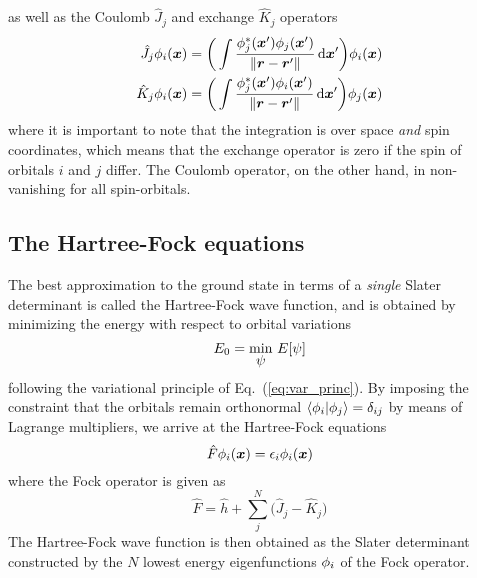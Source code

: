 as well as the Coulomb $\hat{J}_j$ and exchange $\hat{K}_j$ operators
\begin{align}
    \hat{J}_j \phi_i(\boldsymbol x) &= \bigg(\int \frac{\phi_j^{\ast}(\boldsymbol x')\phi_j(\boldsymbol x')}
	{\|\boldsymbol r-\boldsymbol r'\|}\,\mathrm{d}\boldsymbol x'\bigg) \phi_i(\boldsymbol x)\\
    \hat{K}_j \phi_i(\boldsymbol x) &= \bigg(\int \frac{\phi_j^{\ast}(\boldsymbol x')\phi_i(\boldsymbol x')}
	{\|\boldsymbol r-\boldsymbol r'\|}\,\mathrm{d}\boldsymbol x'\bigg) \phi_j(\boldsymbol x)
\end{align}
where it is important to note that the integration is over space \emph{and} spin coordinates,
which means that the exchange operator is zero if the spin of orbitals $i$ and $j$ differ. 
The Coulomb operator, on the other hand, in non-vanishing for all spin-orbitals.

\subsection{The Hartree-Fock equations}
The best approximation to the ground state in terms of a \emph{single} Slater determinant is 
called the Hartree-Fock wave function, and is obtained by minimizing the energy with respect 
to orbital variations
\begin{equation}
    E_0 = \underset{\hbox{\ensuremath{\psi}}}{\text{min}}\ E[\psi]
\end{equation}
following the variational principle of Eq.~(\ref{eq:var_princ}). By imposing the constraint 
that the orbitals remain orthonormal $\langle\phi_i|\phi_j\rangle = \delta_{ij}$
by means of Lagrange multipliers, we arrive at the Hartree-Fock equations
\begin{equation}
    \hat{F}\phi_i(\boldsymbol x) = \epsilon_i \phi_i(\boldsymbol x)
\end{equation}
where the Fock operator is given as
\begin{equation}
    \hat{F} = \hat{h} + \sum_j^N \Big(\hat{J}_j - \hat{K}_j\Big)
\end{equation}
The Hartree-Fock wave function is then obtained as the Slater determinant constructed by 
the $N$ lowest energy eigenfunctions $\phi_i$ of the Fock operator.

